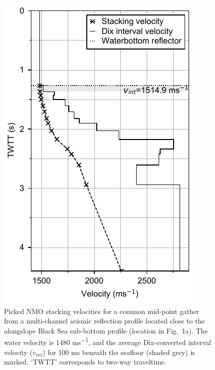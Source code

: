 \documentclass[se,manuscript]{copernicus}
\begin{document}
\clearpage

\begin{figure}
    \includegraphics{figures/si_fig13.pdf}
    \caption{Picked NMO stacking velocities for a common mid-point gather from a multi-channel seismic reflection profile located close to the alongslope Black Sea sub-bottom profile (location in Fig.~1a).
    The water velocity is 1480 \unit{ms^{-1}}, and the average Dix-converted interval velocity ($v_{int}$) for 100 \unit{ms} beneath the seafloor (shaded grey) is marked.
    `TWTT' corresponds to two-way traveltime.}
    \label{fig:stacking-velocities}
\end{figure} 

\clearpage
\end{document}
